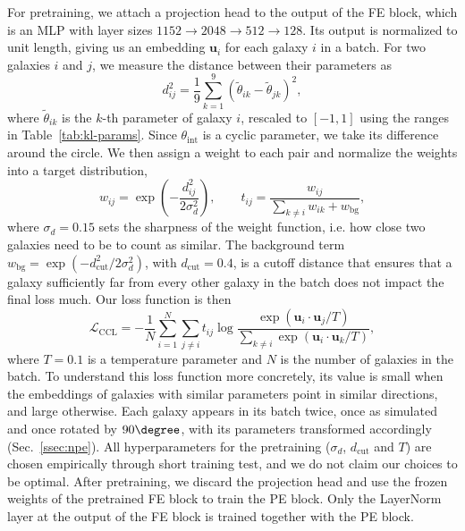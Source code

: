 For pretraining, we attach a projection head to the output of the FE block, which is an MLP with layer sizes $1152 \to 2048 \to 512 \to 128$. Its output is normalized to unit length, giving us an embedding $\mathbf{u}_i$ for each galaxy $i$ in a batch. For two galaxies $i$ and $j$, we measure the distance between their parameters as
\begin{equation}
\label{eqn:ccl-distance}
    d_{ij}^2 = \frac{1}{9}\sum_{k=1}^{9}\left(\tilde{\theta}_{ik} - \tilde{\theta}_{jk}\right)^2,
\end{equation}
where $\tilde{\theta}_{ik}$ is the $k$-th parameter of galaxy $i$, rescaled to $[-1, 1]$ using the ranges in Table~\ref{tab:kl-params}. Since $\theta_\mathrm{int}$ is a cyclic parameter, we take its difference around the circle. We then assign a weight to each pair and normalize the weights into a target distribution,
\begin{equation}
\label{eqn:ccl-target}
    w_{ij} = \exp\left(-\frac{d_{ij}^2}{2\sigma_d^2}\right), \qquad
    t_{ij} = \frac{w_{ij}}{\sum_{k\neq i} w_{ik} + w_\mathrm{bg}},
\end{equation}
where $\sigma_d = 0.15$ sets the sharpness of the weight function, i.e. how close two galaxies need to be to count as similar. The background term $w_\mathrm{bg} = \exp\left(-d_\mathrm{cut}^2/2\sigma_d^2\right)$, with $d_\mathrm{cut}=0.4$, is a cutoff distance that ensures that a galaxy sufficiently far from every other galaxy in the batch does not impact the final loss much. Our loss function is then
\begin{equation}
\label{eqn:ccl-loss}
    \mathcal{L}_\mathrm{CCL} = -\frac{1}{N}\sum_{i=1}^{N}\sum_{j\neq i} t_{ij}\log\frac{\exp(\mathbf{u}_i\cdot\mathbf{u}_j/T)}{\sum_{k\neq i}\exp(\mathbf{u}_i\cdot\mathbf{u}_k/T)},
\end{equation}
where $T=0.1$ is a temperature parameter and $N$ is the number of galaxies in the batch. To understand this loss function more concretely,  its value is small when the embeddings of galaxies with similar parameters point in similar directions, and large otherwise. Each galaxy appears in its batch twice, once as simulated and once rotated by $90\degree$, with its parameters transformed accordingly (Sec.~\ref{ssec:npe}). All hyperparameters for the pretraining ($\sigma_d$, $d_\mathrm{cut}$ and $T$) are chosen empirically through short training test, and we do not claim our choices to be optimal. After pretraining, we discard the projection head and use the frozen weights of the pretrained FE block to train the PE block. Only the LayerNorm layer at the output of the FE block is trained together with the PE block.

